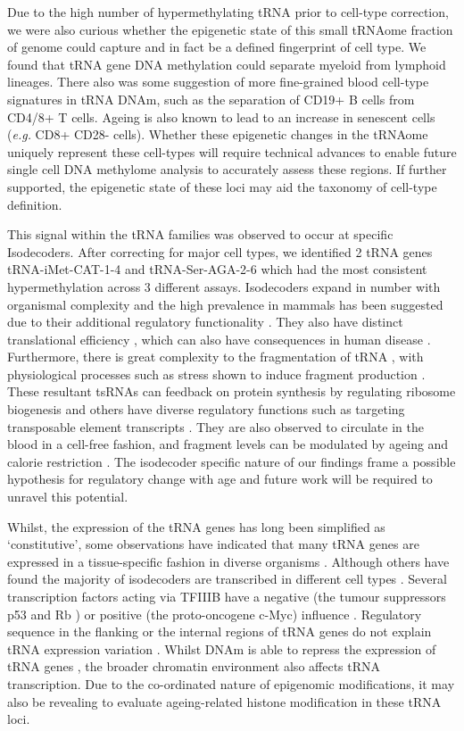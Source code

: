 \documentclass[]{book}
\begin{document}
Due to the high number of hypermethylating tRNA prior to cell-type correction, we were also curious whether the epigenetic state of this small tRNAome fraction of genome could capture and in fact be a defined fingerprint of cell type.
We found that tRNA gene DNA methylation could separate myeloid from lymphoid lineages.
There also was some suggestion of more fine-grained blood cell-type signatures in tRNA DNAm, such as the separation of CD19+ B cells from CD4/8+ T cells.
Ageing is also known to lead to an increase in senescent cells (\emph{e.g.} CD8+ CD28- cells).
Whether these epigenetic changes in the tRNAome uniquely represent these cell-types will require technical advances to enable future single cell DNA methylome analysis to accurately assess these regions.
If further supported, the epigenetic state of these loci may aid the taxonomy of cell-type definition.

This signal within the tRNA families was observed to occur at specific Isodecoders.
After correcting for major cell types, we identified 2 tRNA genes tRNA-iMet-CAT-1-4 and tRNA-Ser-AGA-2-6 which had the most consistent hypermethylation across 3 different assays.
Isodecoders expand in number with organismal complexity and the high prevalence in mammals has been suggested due to their additional regulatory functionality \citep{Goodenbour2006, Keam2014}.
They also have distinct translational efficiency \citep{Geslain2010}, which can also have consequences in human disease \citep{Kirchner2017}.
Furthermore, there is great complexity to the fragmentation of tRNA \citep{Schimmel2017}, with physiological processes such as stress shown to induce fragment production \citep{Li2019}.
These resultant tsRNAs can feedback on protein synthesis by regulating ribosome biogenesis \citep{Kim2017} and others have diverse regulatory functions such as targeting transposable element transcripts \citep{Martinez2017}.
They are also observed to circulate in the blood in a cell-free fashion, and fragment levels can be modulated by ageing and calorie restriction \citep{Dhahbi2013}.
The isodecoder specific nature of our findings frame a possible hypothesis for regulatory change with age and future work will be required to unravel this potential.

Whilst, the expression of the tRNA genes has long been simplified as `constitutive', some observations have indicated that many tRNA genes are expressed in a tissue-specific fashion in diverse organisms \citep{Dittmar2006, Sagi2016}.
Although others have found the majority of isodecoders are transcribed in different cell types \citep{Parisien2013}.
Several transcription factors acting via TFIIIB \citep{Gomez-Roman2003} have a negative (the tumour suppressors p53 \citep{Crighton2003} and Rb \citep{Sutcliffe2000}) or positive (the proto-oncogene c-Myc) influence \citep{Gomez-Roman2003}.
Regulatory sequence in the flanking or the internal regions of tRNA genes do not explain tRNA expression variation \citep{Schmitt2014}.
Whilst DNAm is able to repress the expression of tRNA genes \citep{Besser1990}, the broader chromatin environment also affects tRNA transcription.
Due to the co-ordinated nature of epigenomic modifications, it may also be revealing to evaluate ageing-related histone modification in these tRNA loci.
\end{document}
